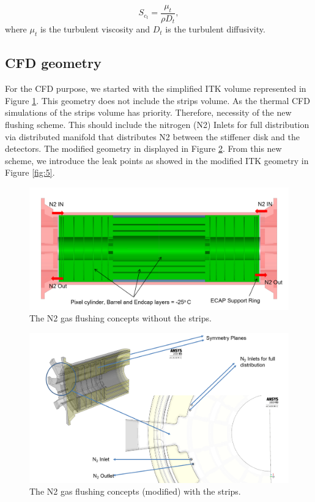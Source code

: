 \documentclass[a4paper]{jpconf}
\begin{document}
\begin{equation}
S_{c_t}=\frac{\mu_t}{\rho D_t},
\end{equation}
where $\mu_t$ is the turbulent viscosity and $D_t$ is the turbulent
diffusivity.

\subsection{CFD geometry}

For the CFD purpose, we started with the simplified ITK volume represented in Figure \ref{fig:3}. 
This geometry does not include the strips volume. As the thermal CFD simulations of the strips volume has priority. 
Therefore, necessity of the new flushing scheme. This should include the nitrogen (N2) Inlets for full distribution via distributed manifold that distributes N2 between the stiffener disk and the detectors. The modified geometry in displayed in Figure \ref{fig:4}. From this new scheme, we introduce the leak points as showed in the modified
ITK geometry in Figure \ref{fig:5}. 

\begin{figure}[!ht]
\begin{center}
  \includegraphics[width=0.50\linewidth]{SR1Case1.png}
  \caption{The N2 gas flushing concepts without the strips. } 
  \label{fig:3} 
	\end{center}
\end{figure}

\begin{figure}[!ht]
\begin{center}
  \includegraphics[width=0.50\linewidth]{N2newscheme.png}
  \caption{The N2 gas flushing concepts (modified) with the strips.} 
  \label{fig:4} 
	\end{center}
\end{figure}
\end{document}
